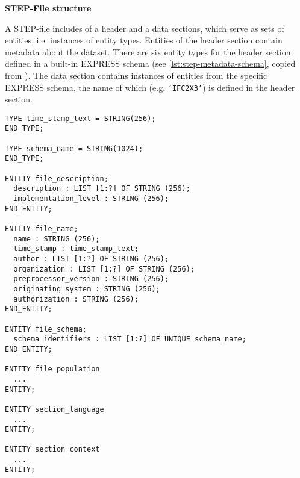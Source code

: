 \noindent\textbf{STEP-File structure}

A STEP-file includes of a header and a data sections, which serve as sets of entities, i.e. instances of entity types.
Entities of the header section contain metadata about the dataset.
There are six entity types for the header section defined in a built-in EXPRESS schema (see \autoref{lst:step-metadata-schema}, copied from \cite{hafele2008ifcheader}).
The data section contains instances of entities from the specific EXPRESS schema, the name of which (e.g. \texttt{'IFC2X3'}) is defined in the header section.


\begin{lstlisting}[caption={The built-in EXPRESS schema for STEP metadata},label=lst:step-metadata-schema]
TYPE time_stamp_text = STRING(256);
END_TYPE;

TYPE schema_name = STRING(1024);
END_TYPE;

ENTITY file_description;
  description : LIST [1:?] OF STRING (256);
  implementation_level : STRING (256);
END_ENTITY;

ENTITY file_name;
  name : STRING (256);
  time_stamp : time_stamp_text;
  author : LIST [1:?] OF STRING (256);
  organization : LIST [1:?] OF STRING (256);
  preprocessor_version : STRING (256);
  originating_system : STRING (256);
  authorization : STRING (256);
END_ENTITY;

ENTITY file_schema;
  schema_identifiers : LIST [1:?] OF UNIQUE schema_name;
END_ENTITY;

ENTITY file_population
  ...
ENTITY;

ENTITY section_language
  ...
ENTITY;

ENTITY section_context
  ...
ENTITY;
\end{lstlisting}



